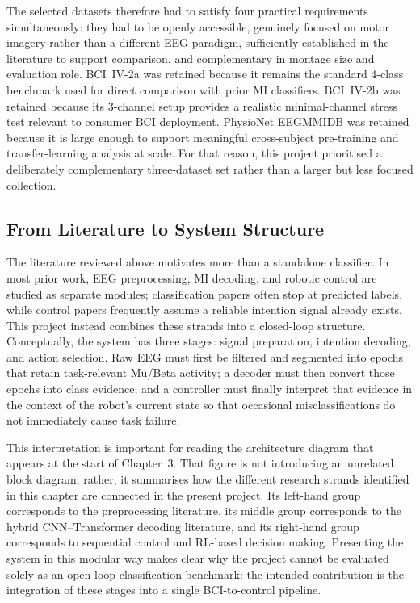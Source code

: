 \documentclass[12pt, a4paper]{article}
\begin{document}
The selected datasets therefore had to satisfy four practical requirements simultaneously: they had to be openly accessible, genuinely focused on motor imagery rather than a different EEG paradigm, sufficiently established in the literature to support comparison, and complementary in montage size and evaluation role. BCI~IV-2a was retained because it remains the standard 4-class benchmark used for direct comparison with prior MI classifiers. BCI~IV-2b was retained because its 3-channel setup provides a realistic minimal-channel stress test relevant to consumer BCI deployment. PhysioNet EEGMMIDB was retained because it is large enough to support meaningful cross-subject pre-training and transfer-learning analysis at scale. For that reason, this project prioritised a deliberately complementary three-dataset set rather than a larger but less focused collection.

\subsection{From Literature to System Structure}

The literature reviewed above motivates more than a standalone classifier. In most prior work, EEG preprocessing, MI decoding, and robotic control are studied as separate modules; classification papers often stop at predicted labels, while control papers frequently assume a reliable intention signal already exists. This project instead combines these strands into a closed-loop structure. Conceptually, the system has three stages: signal preparation, intention decoding, and action selection. Raw EEG must first be filtered and segmented into epochs that retain task-relevant Mu/Beta activity; a decoder must then convert those epochs into class evidence; and a controller must finally interpret that evidence in the context of the robot's current state so that occasional misclassifications do not immediately cause task failure.

This interpretation is important for reading the architecture diagram that appears at the start of Chapter~3. That figure is not introducing an unrelated block diagram; rather, it summarises how the different research strands identified in this chapter are connected in the present project. Its left-hand group corresponds to the preprocessing literature, its middle group corresponds to the hybrid CNN--Transformer decoding literature, and its right-hand group corresponds to sequential control and RL-based decision making. Presenting the system in this modular way makes clear why the project cannot be evaluated solely as an open-loop classification benchmark: the intended contribution is the integration of these stages into a single BCI-to-control pipeline.
\end{document}
